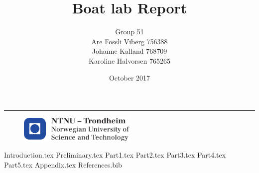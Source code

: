 \documentclass[11pt,a4paper]{article} %
\title{Boat lab Report}
\author{Group 51 \\ Are Fossli Viberg 756388 \\ Johanne Kalland 768709\\ Karoline Halvorsen 765265 }
\date{October 2017}
\numberwithin{equation}{section}
\begin{document}
\begin{titlepage}
    \maketitle
    \rule{\linewidth}{0.5mm}
    \begin{figure}
    \centering
    \includegraphics[width=0.5\textwidth]{Figures/logontnu_eng.pdf}
    \end{figure}
    \thispagestyle{empty}
\end{titlepage} 

\newpage
\tableofcontents
\thispagestyle{empty} %



\newpage
{Introduction.tex}
\newpage
{Preliminary.tex}
\newpage
{Part1.tex}
\newpage
{Part2.tex}
\newpage
{Part3.tex}
\newpage
{Part4.tex}
\newpage
{Part5.tex}
\newpage
{Appendix.tex}
\newpage
{References.bib}
\end{document}
